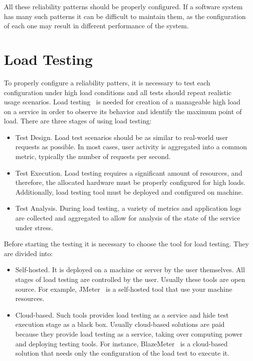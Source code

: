 All these reliability patterns should be properly configured. If a software system has many such patterns it can be difficult to maintain them, as the configuration of each one may result in different performance of the system.

\section{Load Testing}\label{sec:load-testing}
To properly configure a reliability patters, it is necessary to test each configuration under high load conditions and all tests should repeat realistic usage scenarios. Load testing~\cite{load_testing_tips} is needed for creation of a manageable high load on a service in order to observe its behavior and identify the maximum point of load. There are three stages of using load testing:

\begin{itemize}
    \item Test Design. Load test scenarios should be as similar to real-world user requests as possible. In most cases, user activity is aggregated into a common metric, typically the number of requests per second.
    \item Test Execution. Load testing requires a significant amount of resources, and therefore, the allocated hardware must be properly configured for high loads. Additionally, load testing tool must be deployed and configured on machine.
    \item Test Analysis. During load testing, a variety of metrics and application logs are collected and aggregated to allow for analysis of the state of the service under stress.
\end{itemize}

Before starting the testing it is necessary to choose the tool for load testing. They are divided into:
\begin{itemize}
    \item Self-hosted. It is deployed on a machine or server by the user themselves. All stages of load testing are controlled by the user. Usually these tools are open source. For example, JMeter~\cite{jmeter} is a self-hosted tool that use your machine resources.
    \item Cloud-based. Such tools provides load testing as a service and hide test execution stage as a black box. Usually cloud-based solutions are paid because they provide load testing as a service, taking over computing power and deploying testing tools. For instance, BlazeMeter~\cite{blazemeter} is a cloud-based solution that needs only the configuration of the load test to execute it.
\end{itemize}

